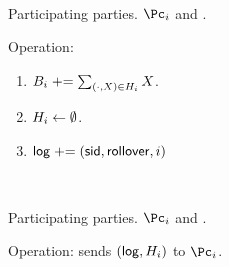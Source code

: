 \begin{protocol}~\label{prot:ConfidentialTransactions:Update}
	\item[Participating parties.] $\Pc_i$ and \Cc.
	
	\item Operation: \Cc 
	
	\begin{enumerate}
	
	\item $B_i  \mathrel{+}= \sum_{(\cdot,X) \in H_i} X$.
	
	
	\item  $H_i \leftarrow \emptyset$.
	
	\item  $\mathsf{log} \mathrel{+}= (\mathsf{sid},\mathsf{rollover},i)$
	
	
\end{enumerate}
	
\end{protocol}

\begin{protocol}~\label{prot:ConfidentialTransactions:History}
	\item[Participating parties.] $\Pc_i$ and \Cc.
		
	\item Operation: \Cc sends $(\mathsf{log},H_i)$ to $\Pc_i$.
	
\end{protocol}
